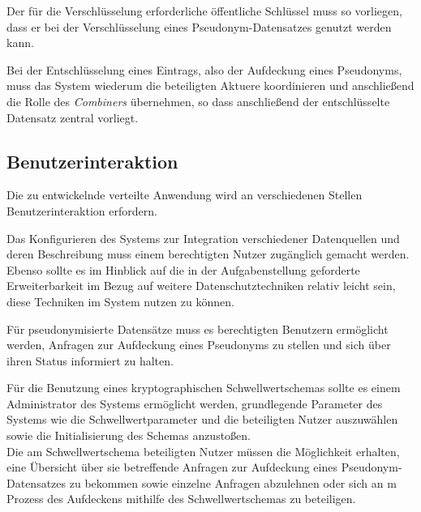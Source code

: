 Der für die Verschlüsselung erforderliche öffentliche Schlüssel muss so vorliegen, dass er bei der Verschlüsselung eines Pseudonym-Datensatzes genutzt werden kann.

Bei der Entschlüsselung eines Eintrags, also der Aufdeckung eines Pseudonyms, muss das System wiederum die beteiligten Aktuere koordinieren und anschließend die Rolle des \textit{Combiners} übernehmen, so dass anschließend der entschlüsselte Datensatz zentral vorliegt.

\subsection*{Benutzerinteraktion}




Die zu entwickelnde verteilte Anwendung wird an verschiedenen Stellen Benutzerinteraktion erfordern.

Das Konfigurieren des Systems zur Integration verschiedener Datenquellen und deren Beschreibung muss einem berechtigten Nutzer zugänglich gemacht werden. Ebenso sollte es im Hinblick auf die in der Aufgabenstellung geforderte Erweiterbarkeit im Bezug auf weitere Datenschutztechniken relativ leicht sein, diese Techniken im System nutzen zu können. 

Für pseudonymisierte Datensätze muss es berechtigten Benutzern ermöglicht werden, Anfragen zur Aufdeckung eines Pseudonyms zu stellen und sich über ihren Status informiert zu halten.

Für die Benutzung eines kryptographischen Schwellwertschemas sollte es einem Administrator des Systems ermöglicht werden, grundlegende Parameter des Systems wie die Schwellwertparameter und die beteiligten Nutzer auszuwählen sowie die Initialisierung des Schemas anzustoßen. \\
Die am Schwellwertschema beteiligten Nutzer müssen die Möglichkeit erhalten, eine Übersicht über sie betreffende Anfragen zur Aufdeckung eines Pseudonym-Datensatzes zu bekommen sowie einzelne Anfragen abzulehnen oder sich an m Prozess des Aufdeckens mithilfe des Schwellwertschemas zu beteiligen. 

